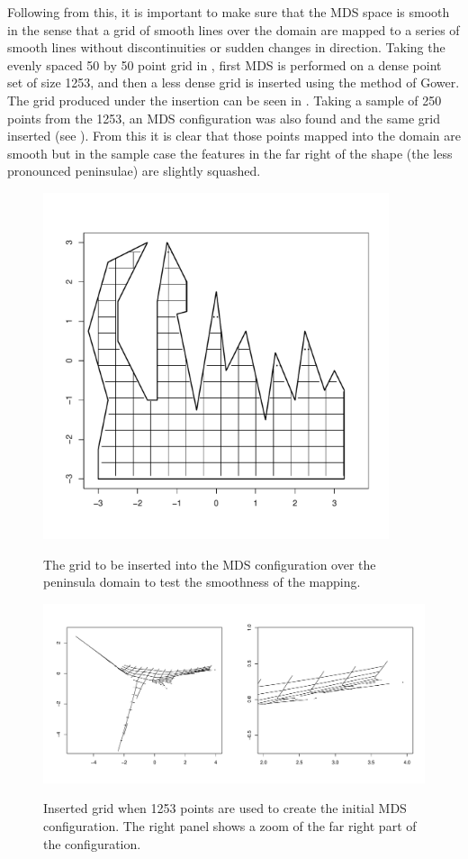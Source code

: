 Following from this, it is important to make sure that the MDS space is smooth in the sense that a grid of smooth lines over the domain are mapped to a series of smooth lines without discontinuities or sudden changes in direction. Taking the evenly spaced 50 by 50 point grid in , first MDS is performed on a dense point set of size 1253, and then a less dense grid is inserted using the method of Gower. The grid produced under the insertion can be seen in . Taking a sample of 250 points from the 1253, an MDS configuration was also found and the same grid inserted (see ). From this it is clear that those points mapped into the domain are smooth but in the sample case the features in the far right of the shape (the less pronounced peninsulae) are slightly squashed.

\begin{figure}
\centering
\includegraphics[width=4in]{mds/figs/wt2-grid-orig.pdf} \\
\caption{The grid to be inserted into the MDS configuration over the peninsula domain to test the smoothness of the mapping.}
\label{wt2-grid-orig}
\end{figure}

\begin{figure}
\centering
\includegraphics[width=5in]{mds/figs/wt2-grid-full.pdf} \\
\caption{Inserted grid when 1253 points are used to create the initial MDS configuration. The right panel shows a zoom of the far right part of the configuration.}
\label{wt2-grid-full}
\end{figure}

